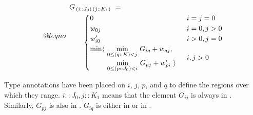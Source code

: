 \makeatletter
\newcommand{\LeftEqNo}{\let\veqno\@@leqno}
\makeatother

\begin{equation}\LeftEqNo
\renewcommand\arraystretch{1.5}
\begin{array}{l@{}l}
	G_{\,(i :: J_0)\,(j :: K_1)} ~=~  \\
	\qquad
	\begin{cases}
		0                        & i=j=0 \\
		w_{0j}                   & i=0, j>0 \\
		w'_{i0}                  & i>0, j=0 \\
		\begin{array}{@{}l@{~}l}
		  \min\langle & \underset{0\leq (q::K) <j}\min ~ G_{iq} + w_{qj}, \\
		              & \underset{0\leq (p::J_0) <i}\min ~ G_{pj} + w'_{pi}~\rangle
		\end{array}              & i,j>0
	\end{cases}
\end{array}
\end{equation}

\medskip
Type annotations have been placed on $i$, $j$, $p$, and $q$ to define the regions
over which they range. $i::J_0, j::K_1$ means that the element $G_{ij}$
is always in . Similarly, $G_{pj}$ is also in . $G_{iq}$ is either in
 or in .


